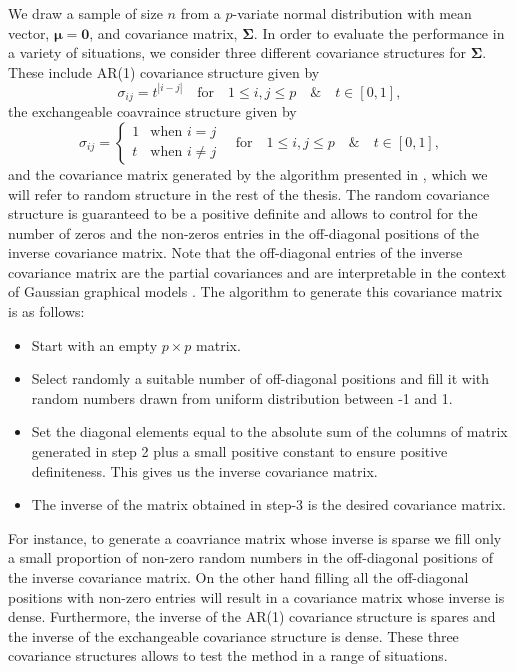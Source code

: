 We draw a sample of size $n$ from a $p$-variate normal distribution with mean vector, $\boldsymbol{\mu=0}$, and covariance matrix, $\boldsymbol{\Sigma}$. In order to evaluate the performance in a variety of situations, we consider three different covariance structures for $\boldsymbol{\Sigma}$. These include AR(1) covariance structure given by 
\begin{equation*}
     \sigma_{ij} = t^{|i-j|} \quad     \text{for} \quad  1 \le i,j \le p \quad \& \quad t \in[0,1],
\end{equation*}
the exchangeable coavraince structure given by
\begin{equation*}
\sigma_{ij} = 
\begin{cases}
                                   1 & \text{when $i=j$} \\
                                   t & \text{when $i \neq j$} 
  \end{cases} \quad     \text{for} \quad  1 \le i,j \le p \quad \& \quad t \in[0,1],
\end{equation*}
and the covariance matrix generated by the algorithm presented in \cite{schafer2004empirical}, which we will refer to random structure in the rest of the thesis. The random covariance structure is guaranteed to be a positive definite and allows to control for the number of zeros and the non-zeros entries in the off-diagonal positions of the inverse covariance matrix. Note that the off-diagonal entries of the inverse covariance matrix are the partial covariances and are interpretable in the context of Gaussian graphical models \citep{dempster1972covariance}. The algorithm to generate this covariance matrix is as follows:
\begin{itemize}
\item Start with an empty $p \times p$ matrix.
\item Select randomly a suitable number of off-diagonal positions and fill it with random numbers drawn from uniform distribution between -1 and 1.
\item Set the diagonal elements equal to the absolute sum of the columns of matrix generated in step 2 plus a small positive constant to ensure positive definiteness. This gives us the inverse covariance matrix.
\item The inverse of the matrix obtained in step-3 is the desired covariance matrix. 
\end{itemize}  
For instance, to generate a coavriance matrix whose inverse is sparse we fill only a small proportion of non-zero random numbers in the off-diagonal positions of the inverse covariance matrix. On the other hand filling all the off-diagonal positions with non-zero entries will result in a covariance matrix whose inverse is dense. Furthermore, the inverse of the AR(1) covariance structure is spares and the inverse of the exchangeable covariance structure is dense. These three covariance structures allows to test the method in a range of situations.  

